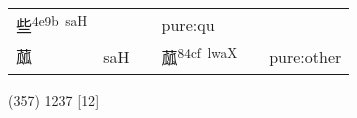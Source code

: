 \documentclass[14pt,a4paper]{scrartcl}
\begin{document}
\begin{longtable}[c]{@{}llllll@{}}
\begin{minipage}[t]{0.14\columnwidth}
些\textsuperscript{4e9b~saH}
\strut\end{minipage} &
\begin{minipage}[t]{0.14\columnwidth}\raggedright\strut
\strut\end{minipage} &
\begin{minipage}[t]{0.14\columnwidth}\raggedright\strut
\strut\end{minipage} &
\begin{minipage}[t]{0.14\columnwidth}\raggedright\strut
pure:qu
\strut\end{minipage}\tabularnewline
\begin{minipage}[t]{0.14\columnwidth}\raggedright\strut
蓏
\strut\end{minipage} &
\begin{minipage}[t]{0.14\columnwidth}\raggedright\strut
saH
\strut\end{minipage} &
\begin{minipage}[t]{0.14\columnwidth}\raggedright\strut
\strut\end{minipage} &
\begin{minipage}[t]{0.14\columnwidth}\raggedright\strut
蓏\textsuperscript{84cf~lwaX}
\strut\end{minipage} &
\begin{minipage}[t]{0.14\columnwidth}\raggedright\strut
\strut\end{minipage} &
\begin{minipage}[t]{0.14\columnwidth}\raggedright\strut
pure:other
\strut\end{minipage}\tabularnewline
\bottomrule
\end{longtable}

(357) 1237 {[}12{]}
\end{document}
